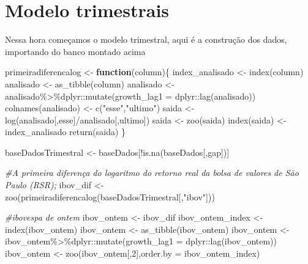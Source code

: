 \documentclass[
]{article}
\newenvironment{Shaded}{\begin{snugshade}}{\end{snugshade}}
\newcommand{\AttributeTok}[1]{\textcolor[rgb]{0.77,0.63,0.00}{#1}}
\newcommand{\CommentTok}[1]{\textcolor[rgb]{0.56,0.35,0.01}{\textit{#1}}}
\newcommand{\ControlFlowTok}[1]{\textcolor[rgb]{0.13,0.29,0.53}{\textbf{#1}}}
\newcommand{\DecValTok}[1]{\textcolor[rgb]{0.00,0.00,0.81}{#1}}
\newcommand{\FunctionTok}[1]{\textcolor[rgb]{0.00,0.00,0.00}{#1}}
\newcommand{\NormalTok}[1]{#1}
\newcommand{\OtherTok}[1]{\textcolor[rgb]{0.56,0.35,0.01}{#1}}
\newcommand{\SpecialCharTok}[1]{\textcolor[rgb]{0.00,0.00,0.00}{#1}}
\newcommand{\StringTok}[1]{\textcolor[rgb]{0.31,0.60,0.02}{#1}}
\begin{document}
\hypertarget{modelo-trimestrais}{%
\section{Modelo trimestrais}\label{modelo-trimestrais}}

Nessa hora começamos o modelo trimestral, aqui é a construção dos dados,
importando do banco montado acima

\begin{Shaded}
\begin{Highlighting}[]
\NormalTok{primeiradiferencalog }\OtherTok{\textless{}{-}} \ControlFlowTok{function}\NormalTok{(column)\{}
\NormalTok{  index\_analisado }\OtherTok{\textless{}{-}} \FunctionTok{index}\NormalTok{(column)}
\NormalTok{  analisado }\OtherTok{\textless{}{-}} \FunctionTok{as\_tibble}\NormalTok{(column)}
\NormalTok{  analisado }\OtherTok{\textless{}{-}}\NormalTok{ analisado}\SpecialCharTok{\%\textgreater{}\%}\NormalTok{dplyr}\SpecialCharTok{::}\FunctionTok{mutate}\NormalTok{(}\AttributeTok{growth\_lag1 =}\NormalTok{ dplyr}\SpecialCharTok{::}\FunctionTok{lag}\NormalTok{(analisado))}
  \FunctionTok{colnames}\NormalTok{(analisado) }\OtherTok{\textless{}{-}} \FunctionTok{c}\NormalTok{(}\StringTok{"esse"}\NormalTok{,}\StringTok{"ultimo"}\NormalTok{)}
\NormalTok{  saida }\OtherTok{\textless{}{-}} \FunctionTok{log}\NormalTok{(analisado[,}\StringTok{\textquotesingle{}esse\textquotesingle{}}\NormalTok{]}\SpecialCharTok{/}\NormalTok{analisado[,}\StringTok{\textquotesingle{}ultimo\textquotesingle{}}\NormalTok{])}
\NormalTok{  saida }\OtherTok{\textless{}{-}} \FunctionTok{zoo}\NormalTok{(saida)}
  \FunctionTok{index}\NormalTok{(saida) }\OtherTok{\textless{}{-}}\NormalTok{ index\_analisado}
  \FunctionTok{return}\NormalTok{(saida)}
\NormalTok{\}}


\NormalTok{baseDadosTrimestral }\OtherTok{\textless{}{-}}\NormalTok{ baseDados[}\SpecialCharTok{!}\FunctionTok{is.na}\NormalTok{(baseDados[,}\StringTok{\textquotesingle{}gap\textquotesingle{}}\NormalTok{])]}

\CommentTok{\#A primeira diferença do logaritmo do retorno real da bolsa de valores de São Paulo (RSR);}
\NormalTok{ibov\_dif }\OtherTok{\textless{}{-}} \FunctionTok{zoo}\NormalTok{(}\FunctionTok{primeiradiferencalog}\NormalTok{(baseDadosTrimestral[,}\StringTok{"ibov"}\NormalTok{]))}

\CommentTok{\#ibovespa de ontem}
\NormalTok{ibov\_ontem }\OtherTok{\textless{}{-}}\NormalTok{ ibov\_dif}
\NormalTok{ibov\_ontem\_index }\OtherTok{\textless{}{-}} \FunctionTok{index}\NormalTok{(ibov\_ontem)}
\NormalTok{ibov\_ontem }\OtherTok{\textless{}{-}} \FunctionTok{as\_tibble}\NormalTok{(ibov\_ontem)}
\NormalTok{ibov\_ontem }\OtherTok{\textless{}{-}}\NormalTok{ ibov\_ontem}\SpecialCharTok{\%\textgreater{}\%}\NormalTok{dplyr}\SpecialCharTok{::}\FunctionTok{mutate}\NormalTok{(}\AttributeTok{growth\_lag1 =}\NormalTok{ dplyr}\SpecialCharTok{::}\FunctionTok{lag}\NormalTok{(ibov\_ontem))}
\NormalTok{ibov\_ontem }\OtherTok{\textless{}{-}} \FunctionTok{zoo}\NormalTok{(ibov\_ontem[,}\DecValTok{2}\NormalTok{],}\AttributeTok{order.by =}\NormalTok{ ibov\_ontem\_index)}


\end{Highlighting}
\end{Shaded}
\end{document}
